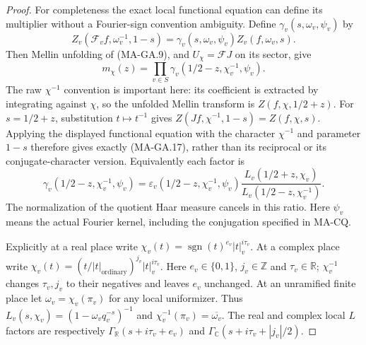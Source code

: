\begin{proof}
For completeness the exact local functional equation can
define its multiplier without a Fourier-sign convention
ambiguity.  Define $\gamma_v(s,\omega_v,\psi_v)$ by
\[
 Z_v(\mathcal F_v f,\omega_v^{-1},1-s)
       =\gamma_v(s,\omega_v,\psi_v)Z_v(f,\omega_v,s).
\]
Then Mellin unfolding of (MA-GA.9), and $U_\chi=\mathcal FJ$
on its sector, give
\[
 m_\chi(z)=\prod_{v\in S}
    \gamma_v(1/2-z,\chi_v^{-1},\psi_v).
 \tag{MA-GA.17}
\]
The raw $\chi^{-1}$ convention is important here: its
coefficient is extracted by integrating against $\chi$, so
the unfolded Mellin transform is $Z(f,\chi,1/2+z)$.
For $s=1/2+z$, substitution $t\mapsto t^{-1}$ gives
$Z(Jf,\chi^{-1},1-s)=Z(f,\chi,s)$.  Applying the displayed
functional equation with the character $\chi^{-1}$ and
parameter $1-s$ therefore gives exactly (MA-GA.17), rather
than its reciprocal or its conjugate-character version.
Equivalently each factor is
\[
 \gamma_v(1/2-z,\chi_v^{-1},\psi_v)
   =\varepsilon_v(1/2-z,\chi_v^{-1},\psi_v)
       \frac{L_v(1/2+z,\chi_v)}
            {L_v(1/2-z,\chi_v^{-1})}.
 \tag{MA-GA.17a}
\]
The normalization of the quotient Haar measure cancels in
this ratio.  Here $\psi_v$ means the actual Fourier kernel,
including the conjugation specified in MA-CQ.

Explicitly at a real place write
$\chi_v(t)=\operatorname{sgn}(t)^{e_v}|t|_v^{i\tau_v}$.
At a complex place write
$\chi_v(t)=(t/|t|_{\mathrm{ordinary}})^{j_v}|t|_v^{i\tau_v}$.
Here $e_v\in\{0,1\}$, $j_v\in\mathbb Z$ and
$\tau_v\in\mathbb R$; $\chi_v^{-1}$ changes $\tau_v,j_v$
to their negatives and leaves $e_v$ unchanged.
At an unramified finite place let $\omega_v=\chi_v(\pi_v)$
for any local uniformizer.  Thus
$L_v(s,\chi_v)=(1-\omega_vq_v^{-s})^{-1}$ and
$\chi_v^{-1}(\pi_v)=\overline{\omega_v}$.
The real and complex local $L$ factors are respectively
$\Gamma_{\mathbb R}(s+i\tau_v+e_v)$ and
$\Gamma_{\mathbb C}(s+i\tau_v+|j_v|/2)$.


\end{proof}
